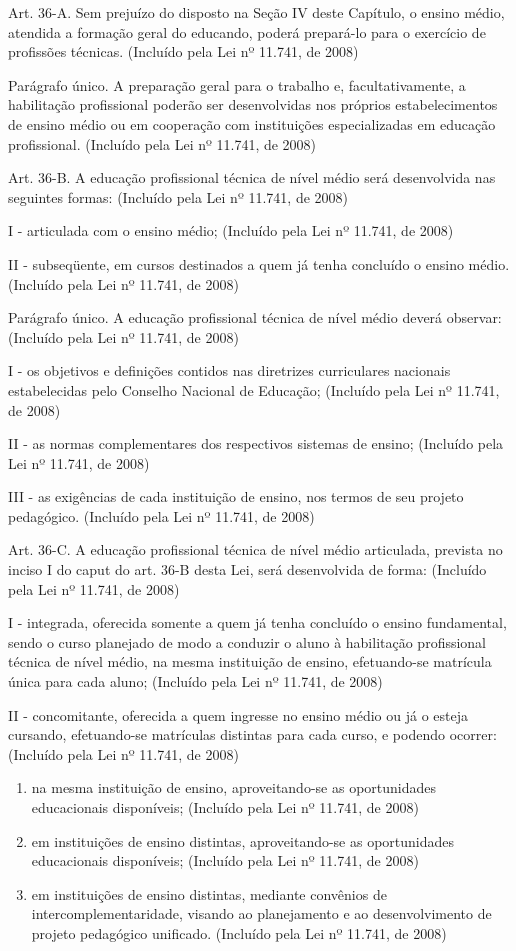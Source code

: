 \documentclass[
]{book}
\begin{document}
Art. 36-A. Sem prejuízo do disposto na Seção IV deste Capítulo, o ensino médio, atendida a formação geral do educando, poderá prepará-lo para o exercício de profissões técnicas. (Incluído pela Lei nº 11.741, de 2008)

Parágrafo único. A preparação geral para o trabalho e, facultativamente, a habilitação profissional poderão ser desenvolvidas nos próprios estabelecimentos de ensino médio ou em cooperação com instituições especializadas em educação profissional. (Incluído pela Lei nº 11.741, de 2008)

Art. 36-B. A educação profissional técnica de nível médio será desenvolvida nas seguintes formas: (Incluído pela Lei nº 11.741, de 2008)

I - articulada com o ensino médio; (Incluído pela Lei nº 11.741, de 2008)

II - subseqüente, em cursos destinados a quem já tenha concluído o ensino médio. (Incluído pela Lei nº 11.741, de 2008)

Parágrafo único. A educação profissional técnica de nível médio deverá observar: (Incluído pela Lei nº 11.741, de 2008)

I - os objetivos e definições contidos nas diretrizes curriculares nacionais estabelecidas pelo Conselho Nacional de Educação; (Incluído pela Lei nº 11.741, de 2008)

II - as normas complementares dos respectivos sistemas de ensino; (Incluído pela Lei nº 11.741, de 2008)

III - as exigências de cada instituição de ensino, nos termos de seu projeto pedagógico. (Incluído pela Lei nº 11.741, de 2008)

Art. 36-C. A educação profissional técnica de nível médio articulada, prevista no inciso I do caput do art. 36-B desta Lei, será desenvolvida de forma: (Incluído pela Lei nº 11.741, de 2008)

I - integrada, oferecida somente a quem já tenha concluído o ensino fundamental, sendo o curso planejado de modo a conduzir o aluno à habilitação profissional técnica de nível médio, na mesma instituição de ensino, efetuando-se matrícula única para cada aluno; (Incluído pela Lei nº 11.741, de 2008)

II - concomitante, oferecida a quem ingresse no ensino médio ou já o esteja cursando, efetuando-se matrículas distintas para cada curso, e podendo ocorrer: (Incluído pela Lei nº 11.741, de 2008)

\begin{enumerate}
\def\labelenumi{\alph{enumi})}
\item
  na mesma instituição de ensino, aproveitando-se as oportunidades educacionais disponíveis; (Incluído pela Lei nº 11.741, de 2008)
\item
  em instituições de ensino distintas, aproveitando-se as oportunidades educacionais disponíveis; (Incluído pela Lei nº 11.741, de 2008)
\item
  em instituições de ensino distintas, mediante convênios de intercomplementaridade, visando ao planejamento e ao desenvolvimento de projeto pedagógico unificado. (Incluído pela Lei nº 11.741, de 2008)
\end{enumerate}
\end{document}
